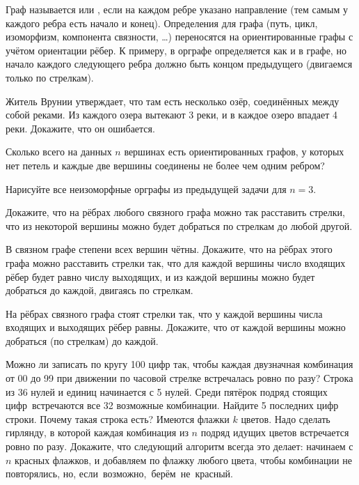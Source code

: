 \documentclass[12pt,a4paper]{article}
\begin{document}



Граф называется  или , если на каждом ребре указано
направление (тем самым у каждого ребра есть начало и конец). Определения для графа (путь, цикл, изоморфизм, компонента связности, \ldots) переносятся на ориентированные графы с учётом ориентации рёбер. К примеру,
 в орграфе определяется как и в графе, но начало каждого следующего ребра должно быть концом предыдущего
(двигаемся только по стрелкам).


Житель Врунии утверждает, что там есть несколько озёр,
соединённых между собой реками. Из каждого озера вытекают
3 реки, и в каждое озеро впадает 4 реки. Докажите, что он
ошибается.

Сколько всего на данных $n$ вершинах есть ориентированных графов, у которых нет петель и каждые две вершины соединены не более чем одним ребром?

Нарисуйте все неизоморфные орграфы из предыдущей задачи для $n=3$.



Докажите, что на рёбрах любого связного графа можно так расставить стрелки, что из некоторой вершины можно будет добраться по стрелкам до любой другой.



В связном графе степени всех вершин чётны. Докажите, что на рёбрах этого графа можно расставить стрелки так, что для каждой вершины число входящих рёбер будет равно числу выходящих, и из каждой вершины можно будет добраться до каждой, двигаясь по стрелкам.

На рёбрах связного графа стоят стрелки так, что у каждой вершины числа входящих и выходящих рёбер равны. Докажите, что от каждой вершины можно добраться (по стрелкам) до каждой.


 Можно ли записать по кругу 100 цифр так, чтобы каждая двузначная комбинация от 00 до 99 при движении по часовой стрелке встречалась ровно по разу?
Строка из 36 нулей и единиц начинается с 5 нулей.
Среди пятёрок подряд стоящих цифр~встречаются все 32 возможные комбинации.
Найдите 5 последних цифр строки.  Почему такая строка есть?
 Имеются флажки $k$ цветов. Надо сделать гирлянду, в которой каждая комбинация из $n$ подряд идущих цветов встречается ровно по разу. Докажите, что  следующий алгоритм всегда это делает: начинаем с $n$ красных флажков, и добавляем по флажку любого цвета, чтобы комбинации не повторялись, но, если~возможно,~берём~не~красный.
\end{document}
